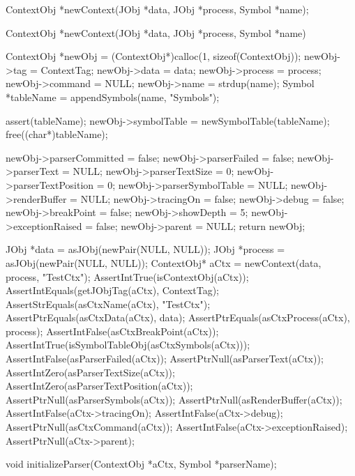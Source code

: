 \startTestSuite[newContext]

\startCHeader
ContextObj *newContext(JObj *data, JObj *process, Symbol *name);
\stopCHeader

\startCCode
ContextObj *newContext(JObj *data, JObj *process, Symbol *name) {
  ContextObj *newObj =
    (ContextObj*)calloc(1, sizeof(ContextObj));
  newObj->tag                = ContextTag;
  newObj->data               = data;
  newObj->process            = process;
  newObj->command            = NULL;
  newObj->name               = strdup(name);
  Symbol *tableName          = appendSymbols(name, "Symbols");
  
  assert(tableName);
  newObj->symbolTable        = newSymbolTable(tableName);
  free((char*)tableName);
  
  newObj->parserCommitted    = false;
  newObj->parserFailed       = false;
  newObj->parserText         = NULL;
  newObj->parserTextSize     = 0;
  newObj->parserTextPosition = 0;
  newObj->parserSymbolTable  = NULL;
  newObj->renderBuffer       = NULL;
  newObj->tracingOn          = false;
  newObj->debug              = false;
  newObj->breakPoint         = false;
  newObj->showDepth          = 5;
  newObj->exceptionRaised    = false;
  newObj->parent             = NULL;
  return newObj;
}
\stopCCode


\startCTest
  JObj *data       = asJObj(newPair(NULL, NULL));
  JObj *process    = asJObj(newPair(NULL, NULL));
  ContextObj* aCtx = newContext(data, process, "TestCtx");
  AssertIntTrue(isContextObj(aCtx));
  AssertIntEquals(getJObjTag(aCtx), ContextTag);
  AssertStrEquals(asCtxName(aCtx), "TestCtx");
  AssertPtrEquals(asCtxData(aCtx), data);
  AssertPtrEquals(asCtxProcess(aCtx), process);
  AssertIntFalse(asCtxBreakPoint(aCtx));
  AssertIntTrue(isSymbolTableObj(asCtxSymbols(aCtx)));
  AssertIntFalse(asParserFailed(aCtx));
  AssertPtrNull(asParserText(aCtx));
  AssertIntZero(asParserTextSize(aCtx));
  AssertIntZero(asParserTextPosition(aCtx));
  AssertPtrNull(asParserSymbols(aCtx));
  AssertPtrNull(asRenderBuffer(aCtx));
  AssertIntFalse(aCtx->tracingOn);
  AssertIntFalse(aCtx->debug);
  AssertPtrNull(asCtxCommand(aCtx));
  AssertIntFalse(aCtx->exceptionRaised);
  AssertPtrNull(aCtx->parent);
\stopCTest
\stopTestCase
\stopTestSuite

\startTestSuite[initializeParser]

\startCHeader
void initializeParser(ContextObj *aCtx, Symbol *parserName);
\stopCHeader

